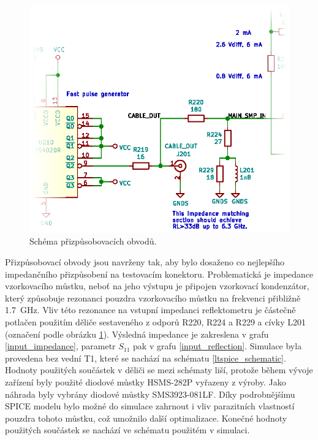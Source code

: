 \begin{figure}[htbp]
\includegraphics[width=\textwidth,keepaspectratio]{images/match_section.eps}\caption{Schéma přizpůsobovacích obvodů.}\label{match_section_schematic}
\end{figure}

Přizpůsobovací obvody jsou navrženy tak, aby bylo dosaženo co nejlepšího impedančního přizpůsobení na testovacím konektoru. Problematická je impedance vzorkovacího můstku, neboť na jeho výstupu je připojen vzorkovací kondenzátor, který způsobuje rezonanci pouzdra vzorkovacího můstku na frekvenci přibližně \SI{1.7}{\giga\hertz}. Vliv této rezonance na vstupní impedanci reflektometru je částečně potlačen použitím děliče sestaveného z odporů R220, R224 a R229 a cívky L201 (označení podle obrázku \ref{match_section_schematic}). Výsledná impedance je zakreslena v grafu \ref{input_impedance}, parametr $S_{11}$ pak v grafu \ref{input_reflection}. Simulace byla provedena bez vední T1, které se nachází na schématu \ref{ltspice_schematic}. Hodnoty použitých součástek v děliči se mezi schématy liší, protože během vývoje zařízení byly použité diodové můstky HSMS-282P vyřazeny z výroby. Jako náhrada byly vybrány diodové můstky SMS3923-081LF. Díky podrobnějšímu SPICE modelu bylo možné do simulace zahrnout i vliv parazitních vlastností pouzdra tohoto můstku, což umožnilo další optimalizace. Konečné hodnoty použitých součástek se nachází ve schématu použitém v simulaci.


